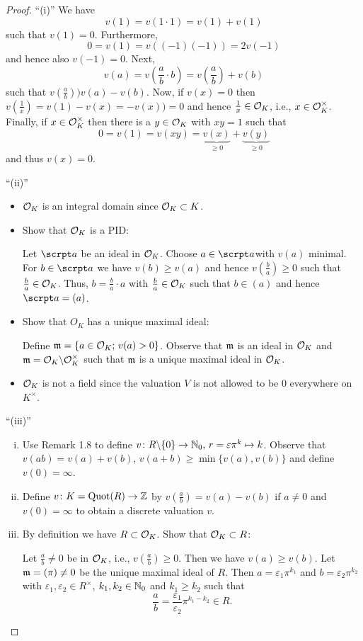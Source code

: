 \begin{proof}
\enquote{(i)}
We have 
\[ v(1) = v(1 \cdot 1) = v(1) + v(1)
\]
such that $v(1) = 0$. Furthermore,
\[ 0 = v(1) = v((-1)(-1)) = 2 v(-1)
\]
and hence also $v(-1)=0$. Next,
\[ v(a) = v\left(\frac{a}{b} \cdot b  \right) = v\left(\frac{a}{b} \right) +v(b)
\]
such that $ v\left(\frac{a}{b} \right) ) v(a) -v(b)$.
Now, if $v(x) = 0$ then $v\left(\frac{1}{x} \right) =v(1) -v(x) = -v(x) ) =0$ and hence $\frac{1}{x} \in \mathcal{O}_K$, i.e., $x \in \mathcal{O}_K^\times$.
Finally, if $x \in \mathcal{O}_K^\times$ then there is a $y \in \mathcal{O}_K$ with $xy = 1$ such that
\[ 0 = v(1) = v(xy) = \underbrace{v(x)}_{\geq 0} + \underbrace{v(y)}_{\geq 0}
\]
and thus $v(x) = 0$.

\bigskip \enquote{(ii)} 
\begin{itemize}
\item $\mathcal{O}_K$ is an integral domain since $\mathcal{O}_K\subset K$.

\item Show that $\mathcal{O}_K$ is a PID:

Let $\a$ be an ideal in $\mathcal{O}_K$. Choose $a \in \a$with $v(a)$ minimal. For $b \in \a$ we have $v(b) \geq v(a)$ and hence $v\left(\frac{b}{a} \right) \geq 0$ such that $\frac{b}{a} \in \mathcal{O}_K$.
Thus, $b = \frac{b}{a} \cdot a$ with $\frac{b}{a} \in \mathcal{O}_K$ such that $b \in (a)$ and hence $\a = (a)$.

\item Show that $O_K$ has a unique maximal ideal:

Define $\mathfrak{m} = \left\{ a \in \mathcal{O}_K; \, v(a) > 0 \right\}$. Observe that $\mathfrak{m}$ is an ideal in $\mathcal{O}_K$ and $\mathfrak{m} = \mathcal{O}_K \backslash \mathcal{O}_K^\times$ such that $\mathfrak{m}$ is a unique maximal ideal in $\mathcal{O}_K$.

\item $\mathcal{O}_K$ is not a field since the valuation $V$ is not allowed to be $0$ everywhere on $K^\times$.
\end{itemize}

\bigskip \enquote{(iii)} 
\begin{enumerate}[(i)]
\item Use Remark 1.8 to define $v \colon R \backslash \{0\} \to \mathbb{N}_0, \,  r = \varepsilon \pi^k \mapsto k$.
Observe that $v(ab) =v(a) + v(b)$, $v(a+b) \geq \min\{ v(a), v(b) \}$ and define $v(0) = \infty$.
\item Define $v \colon K = \operatorname{Quot}(R) \to \mathbb{Z}$ by $v\left(\frac{a}{b} \right) = v(a) -v(b)$ if $a \neq 0$ and $v(0) = \infty$ to obtain a discrete valuation $v$.
\item By definition we have $R\subset \mathcal{O}_K$. Show that $\mathcal{O}_K \subset R$:

Let $\frac{a}{b} \neq 0$ be in $\mathcal{O}_K$, i.e., $v\left(\frac{a}{b} \right) \geq 0$. Then we have $v(a) \geq v(b)$.
Let $\mathfrak{m} = (\pi) \neq 0$ be the unique maximal ideal of $R$. Then
$a = \varepsilon_1 \pi^{k_1}$ and $b = \varepsilon_2 \pi^{k_2}$ with $\varepsilon_1, \varepsilon_2 \in R^\times$, $k_1,k_2 \in \mathbb{N}_0$ and $k_1 \geq k_2$ such that 
\[ \frac{a}{b} = \frac{\varepsilon_1}{\varepsilon_2} \pi^{k_1-k_2} \in R.
\]
\end{enumerate}
\end{proof}

